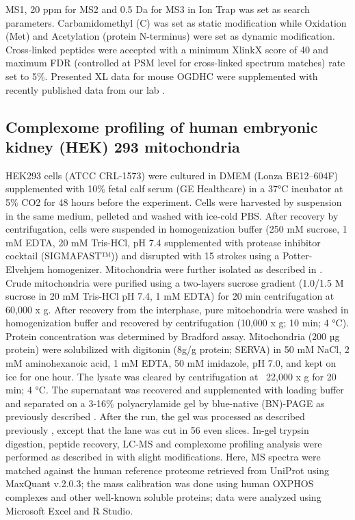 \documentclass[times, twoside]{zHenriquesLab-StyleBioRxiv}
\begin{document}
MS1, 20 ppm for MS2 and 0.5 Da for MS3 in Ion Trap was set as search parameters. Carbamidomethyl (C) was set as static modification while Oxidation (Met) and Acetylation (protein N-terminus) were set as dynamic modification. Cross-linked peptides were accepted with a minimum XlinkX score of 40 and maximum FDR (controlled at PSM level for cross-linked spectrum matches) rate set to 5\%. Presented XL data for mouse OGDHC were supplemented with recently published data from our lab \cite{Liu_2018}.

\subsection*{Complexome profiling of human embryonic kidney (HEK) 293 mitochondria}
HEK293 cells (ATCC CRL-1573) were cultured in DMEM (Lonza BE12–604F) supplemented with 10\% fetal calf serum (GE Healthcare) in a 37°C incubator at 5\% CO2 for 48 hours before the experiment. Cells were harvested by suspension in the same medium, pelleted and washed with ice-cold PBS. After recovery by centrifugation, cells were suspended in homogenization buffer (250 mM sucrose, 1 mM EDTA, 20 mM Tris-HCl, pH 7.4 supplemented with protease inhibitor cocktail (SIGMAFAST™)) and disrupted with 15 strokes using a Potter-Elvehjem homogenizer. Mitochondria were further isolated as described in \cite{Guerrero-Castillo_2017}. Crude mitochondria were purified using a two-layers sucrose gradient (1.0/1.5 M sucrose in 20 mM Tris-HCl pH 7.4, 1 mM EDTA) for 20 min centrifugation at 60,000 x g. After recovery from the interphase, pure mitochondria were washed in homogenization buffer and recovered by centrifugation (10,000 x g; 10 min; 4 °C). Protein concentration was determined by Bradford assay. Mitochondria (200 µg protein) were solubilized with digitonin (8g/g protein; SERVA) in 50 mM NaCl, 2 mM aminohexanoic acid, 1 mM EDTA, 50 mM imidazole, pH 7.0, and kept on ice for one hour. The lysate was cleared by centrifugation at ~22,000 x g for 20 min; 4 °C. The supernatant was recovered and supplemented with loading buffer and separated on a 3-16\% polyacrylamide gel by blue-native (BN)-PAGE as previously described \cite{Wittig_2006}. After the run, the gel was processed as described previously \cite{Evers_2021}, except that the lane was cut in 56 even slices. In-gel trypsin digestion, peptide recovery, LC-MS and complexome profiling analysis were performed as described in \cite{Evers_2021} with slight modifications. Here, MS spectra were matched against the human reference proteome retrieved from UniProt using MaxQuant v.2.0.3; the mass calibration was done using human OXPHOS complexes and other well-known soluble proteins; data were analyzed using Microsoft Excel and R Studio.
\end{document}
